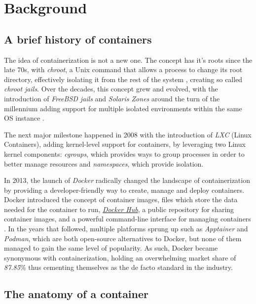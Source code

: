 \chapter{Background}
\label{chapter:background}

\section{A brief history of containers}
\label{sec:history}
The idea of containerization is not a new one. The concept has it's roots
since the late 70s, with \textit{chroot}, a Unix command that allows a process to change its root directory,
effectively isolating it from the rest of the system \cite{history-of-containers}, creating
so called \textit{chroot jails}. Over the decades, this concept grew and evolved, with the introduction
of \textit{FreeBSD jails} and \textit{Solaris Zones} around the turn of the millennium adding support for multiple 
isolated environments within the same OS instance \cite{history-of-containers}. 

The next major milestone happened in 2008 with the introduction of \textit{LXC} (Linux Containers),
adding kernel-level support for containers, by leveraging two Linux kernel components: \textit{cgroups}, which
provides ways to group processes in order to better manage resources and \textit{namespaces}, which provide isolation.\cite{history-of-containers}

In 2013, the launch of \textit{Docker} radically changed the landscape of containerization by providing a developer-friendly way to 
create, manage and deploy containers. Docker introduced the concept of container images, files which store the data needed for the container to run, 
\href{https://hub.docker.com/}{\textit{Docker Hub}}, a public repository for sharing container images, and a powerful command-line interface for managing containers \cite{history-of-containers}.
In the years that followed, multiple platforms sprung up such as \textit{Apptainer} and \textit{Podman}, which are both open-source alternatives to Docker, but none of them managed to gain the same level of popularity.
As such, Docker became synonymous with containerization, holding an overwhelming market share of \textit{87.85}\%\cite{docker-market-share} thus cementing
themselves as the de facto standard in the industry.

\section{The anatomy of a container}
\label{sec:anatomy}


